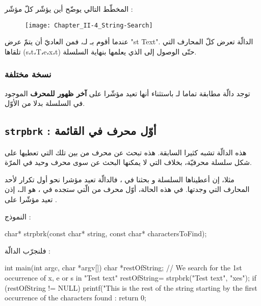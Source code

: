 المخطّط التالي يوضّح أين يؤشّر كلّ مؤشّر :

\begin{figure}[H]
	\centering
	\texttt{[image: Chapter\_II-4\_String-Search]}
\end{figure}

عندما أقوم بـ
لـ،
فمن العاديّ أن يتمّ عرض
"\textenglish{st Text}".
الدالّة
تعرض كلّ المحارف التي تلقاها
(\textenglish{s}،\textenglish{t}،\textenglish{T}،\textenglish{e}،\textenglish{x}،\textenglish{t})
حتّى الوصول إلى
الذي يعلمها بنهاية السلسلة.

\subsubsection{نسخة مختلفة}

توجد دالّة
مطابقة تماما لـ
باستثناء أنها تعيد مؤشّرا على
\textbf{آخر ظهور للمحرف}
الموجود في السلسلة بدلا من الأوّل.

\subsection{\texttt{strpbrk} : أوّل محرف في القائمة}

هذه الدالّة تشبه كثيرا السابقة. هذه تبحث عن محرف من بين تلك التي تعطيها على شكل سلسلة محرفيّة، بخلاف
التي لا يمكنها البحث عن سوى محرف وحيد في المرّة.

مثلا، إن أعطيناها السلسلة
و بحثنا في
،
فالدالّة تعيد مؤشرا نحو أول تكرار لأحد المحارف التي وجدتها.
في هذه الحالة، أوّل محرف من
الّتي ستجده في
،
هو الـ، إذن
تعيد مؤشّرا على
.

النموذج :

\begin{Csource}
char* strpbrk(const char* string, const char* charactersToFind);
\end{Csource}

فلنجرّب الدالّة :

\begin{Csource}
int main(int argc, char *argv[])
{
	char *restOfString;
	// We search for the 1st occurrence of x, e or s in "Test text"
	restOfString= strpbrk("Test text", "xes");
	if (restOfString != NULL)
	 {
    		printf("This is the rest of the string starting by the first occurrence of the characters found : %
	}
	return 0;
}
\end{Csource}

